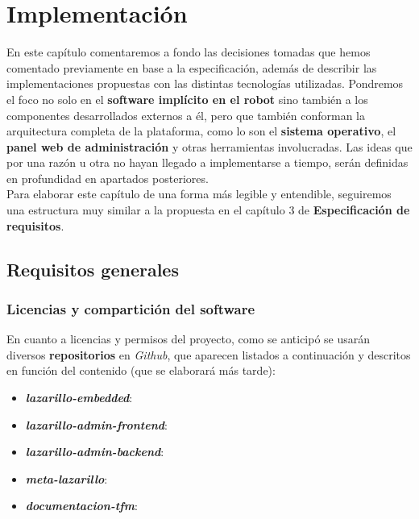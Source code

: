 \chapter{Implementación}

En este capítulo comentaremos a fondo las decisiones tomadas que hemos comentado previamente en base a la especificación, además de describir las implementaciones propuestas con las distintas tecnologías utilizadas. Pondremos el foco no solo en el \textbf{software implícito en el robot} sino también a los componentes desarrollados externos a él, pero que también conforman la arquitectura completa de la plataforma, como lo son el \textbf{sistema operativo}, el \textbf{panel web de administración} y otras herramientas involucradas. Las ideas que por una razón u otra no hayan llegado a implementarse a tiempo, serán definidas en profundidad en apartados posteriores.\\

Para elaborar este capítulo de una forma más legible y entendible, seguiremos una estructura muy similar a la propuesta en el capítulo 3 de \textbf{Especificación de requisitos}.\\


\section{Requisitos generales}


\subsection{Licencias y compartición del software}

En cuanto a licencias y permisos del proyecto, como se anticipó se usarán diversos \textbf{repositorios} en \textit{Github}, que aparecen listados a continuación y descritos en función del contenido (que se elaborará más tarde):

\begin{itemize}
	\item \textbf{\textit{lazarillo-embedded}}: \cite{lazarillo-embedded}
	\item \textbf{\textit{lazarillo-admin-frontend}}: \cite{lazarillo-admin-frontend}
	\item \textbf{\textit{lazarillo-admin-backend}}: \cite{lazarillo-admin-backend}
	\item \textbf{\textit{meta-lazarillo}}: \cite{meta-lazarillo}
	\item \textbf{\textit{documentacion-tfm}}: \cite{documentacion-tfm}
\end{itemize}



